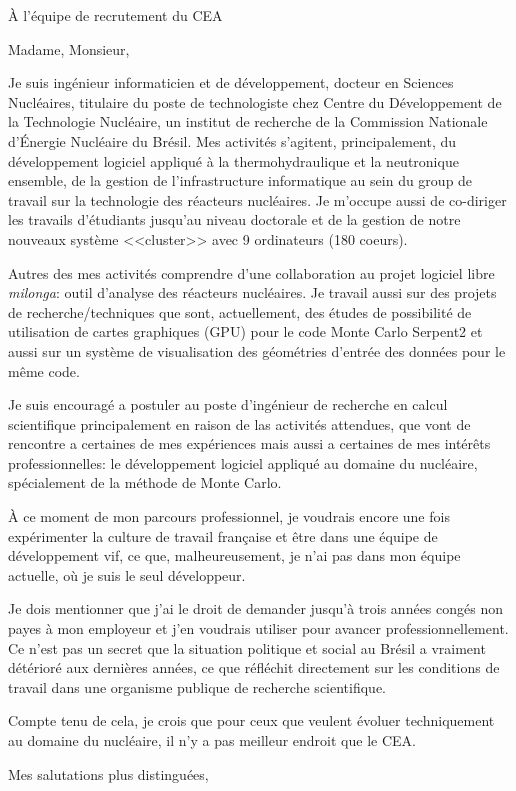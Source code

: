 \documentclass[11pt]{letter}
\begin{document}
\begin{letter}{À l'équipe de recrutement du CEA}

  \opening{Madame, Monsieur,}

  Je suis ingénieur informaticien et de développement, docteur en Sciences Nucléaires, titulaire du poste de technologiste chez Centre du Développement de la Technologie Nucléaire, un institut de recherche de la Commission Nationale d'Énergie Nucléaire du Brésil. Mes activités s'agitent, principalement, du développement logiciel appliqué à la thermohydraulique et la neutronique
  ensemble, de la gestion de l'infrastructure informatique au sein du group de travail sur la technologie des réacteurs
  nucléaires. Je m'occupe aussi de co-diriger les travails d'étudiants jusqu'au niveau
  doctorale et de la gestion de notre nouveaux système <<cluster>> avec 9 ordinateurs (180 coeurs).

  Autres des mes activités comprendre d'une collaboration au projet logiciel libre \textit{milonga}: outil d'analyse
  des réacteurs nucléaires. Je travail aussi sur des projets de recherche/techniques que sont, actuellement, des
  études de possibilité de utilisation de cartes graphiques (GPU) pour le code Monte Carlo Serpent2 et aussi sur un système
  de visualisation des géométries d'entrée des données pour le même code.

  Je suis encouragé a postuler au poste d'ingénieur de recherche en calcul scientifique principalement en raison de las activités attendues, que vont de rencontre a certaines de mes expériences mais aussi a certaines de mes intérêts professionnelles: le développement logiciel appliqué au domaine du nucléaire, spécialement de la méthode de Monte Carlo.

  À ce moment de mon parcours professionnel, je voudrais encore une fois expérimenter la culture de travail française
  et être dans une équipe de développement vif, ce que, malheureusement, je n'ai pas dans mon équipe actuelle, où je
  suis le seul développeur.

  Je dois mentionner que j'ai le droit de demander jusqu'à trois années congés non payes à mon employeur et j'en voudrais
  utiliser pour avancer professionnellement. Ce n'est pas un secret que la situation politique et social au Brésil a
  vraiment détérioré aux dernières années, ce que réfléchit directement sur les conditions de travail dans une organisme
  publique de recherche scientifique.


  Compte tenu de cela, je crois que pour ceux que veulent évoluer techniquement au domaine du nucléaire, il n'y
  a pas meilleur endroit que le CEA.
  
  
  \closing{Mes salutations plus distinguées,}

  
\end{letter}
\end{document}
